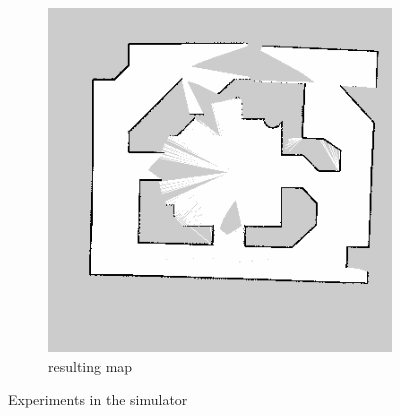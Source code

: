 \documentclass[a4paper]{article}
\begin{document}
\begin{figure}[h!]
\begin{subfigure}[b]{0.8\textwidth}
    \includegraphics[width=\textwidth,height=\textheight,keepaspectratio]{img/gmapping_simulation_map.png}
    \caption{resulting map}
  \end{subfigure}
  \caption{Experiments in the simulator}
  \label{fig:navigationresults}
\end{figure}
\end{document}

